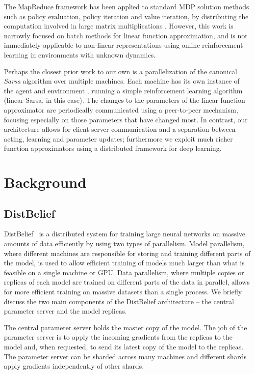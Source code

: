 \documentclass{article}
\begin{document}
The MapReduce framework has been applied to standard MDP solution methods such as policy evaluation, policy iteration and value iteration, by distributing the computation involved in large matrix multiplications \cite{li:mapreduce}. However, this work is narrowly focused on batch methods for linear function approximation, and is not immediately applicable to non-linear representations using online reinforcement learning in environments with unknown dynamics.

Perhaps the closest prior work to our own is a parallelization of the canonical \emph{Sarsa} algorithm over multiple machines. Each machine has its own instance of the agent and environment \cite{grounds:parallelRL}, running a simple reinforcement learning algorithm (linear Sarsa, in this case). The changes to the parameters of the linear function approximator are periodically communicated using a peer-to-peer mechanism, focusing especially on those parameters that have changed most. In contrast, our architecture allows for client-server communication and a separation between acting, learning and parameter updates; furthermore we exploit much richer function approximators using a distributed framework for deep learning.
 \section{Background}
\subsection{DistBelief}
DistBelief~\cite{dean2012distbelief} is a distributed system for training large neural networks on massive amounts of data efficiently by using two types of parallelism.
Model parallelism, where different machines are responsible for storing and training different parts of the model, is used to allow efficient training of models much larger than what is feasible on a single machine or GPU.
Data parallelism, where multiple copies or replicas of each model are trained on different parts of the data in parallel, allows for more efficient training on massive datasets than a single process.
We briefly discuss the two main components of the DistBelief architecture -- the central parameter server and the model replicas.

The central parameter server holds the master copy of the model. The job of the parameter server is to apply the incoming gradients from the replicas to the model and, when requested, to send its latest copy of the model to the replicas. The parameter server can be sharded across many machines and different shards apply gradients independently of other shards.
\end{document}

